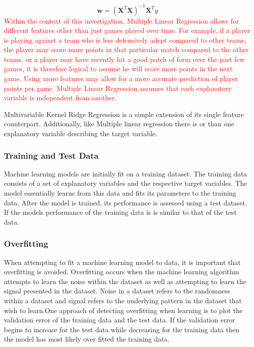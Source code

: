 \documentclass[a4paper,11pt,twoside]{article}
\begin{document}
\begin{equation}
\textbf{w} = (\textbf{X}^T\textbf{X})^{-1}\textbf{X}^Ty
\end{equation}
\textcolor{red}{Within the context of this investigation, Multiple Linear Regression allows for different features other than just games played over time. For example, if a player is playing against a team who is less defensively adept compared to other teams, the player may score more points in that particular match compared to the other teams, or a player may have recently hit a good patch of form over the past few games, it is therefore logical to assume he will score more points in the next game. Using more features may allow for a more accurate prediction of player points per game. Multiple Linear Regression assumes that each explanatory variable is independent from another.}

Multivariable Kernel Ridge Regression is a simple extension of its single feature counterpart. Additionally, like Multiple linear regression there is or than one explanatory variable describing the target variable. 

 \subsubsection{Training and Test Data}
Machine learning models are initially fit on a training dataset. The training data consists of a set of explanatory variables and the respective target variables. The model essentially learns from this data and fits its parameters to the training data. After the model is trained, its performance is assessed using a test dataset. If the models performance of the training data is is similar to that of the test data.

\subsubsection{Overfitting}
When attempting to fit a machine learning model to data, it is important that overfitting is avoided. Overfitting occurs when the machine learning algorithm attempts to learn the noise within the dataset as well as attempting to learn the signal presented in the dataset. Noise in a dataset refers to the randomness within a dataset and signal refers to the underlying pattern in the dataset that wish to learn.One approach of detecting overfitting when learning is to plot the validation error of the training data and the test data. If the validation error begins to increase for the test data while decreasing for the training data then the model has most likely over fitted the training data. 
\end{document}
